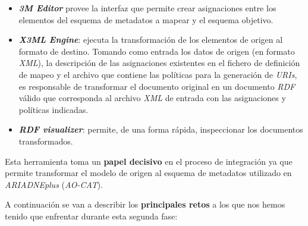
\begin{itemize}
\tightlist
\item
  \emph{\textbf{3M Editor}} provee la interfaz que permite crear asignaciones
  entre los elementos del esquema de metadatos a mapear y el esquema
  objetivo.
\end{itemize}


\begin{itemize}
\tightlist
\item
  \emph{\textbf{X3ML Engine}}: ejecuta la transformación de los elementos de
  origen al formato de destino. Tomando como entrada los datos de origen
  (en formato \emph{XML}), la descripción de las asignaciones existentes en el
  fichero de definición de mapeo y el archivo que contiene las políticas
  para la generación de \emph{URIs}, es responsable de transformar el documento
  original en un documento \emph{RDF} válido que corresponda al archivo \emph{XML} de
  entrada con las asignaciones y políticas indicadas.
\item
  \emph{\textbf{RDF visualizer}}: permite, de una forma rápida, inspeccionar los
  documentos transformados.
\end{itemize}


Esta herramienta toma un \textbf{papel decisivo} en el proceso de
integración ya que permite transformar el modelo de origen al esquema de
metadatos utilizado en \emph{ARIADNEplus} (\emph{AO-CAT}).

A continuación se van a describir los \textbf{principales \textbf{retos}} a los
que nos hemos tenido que enfrentar durante esta segunda fase:


